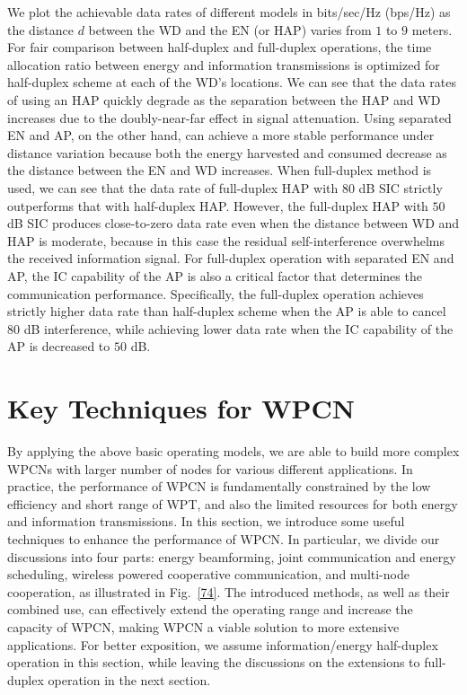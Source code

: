 \documentclass[journal, draftcls, one column, 12pt]{IEEEtran}
\begin{document}
We plot the achievable data rates of different models in bits/sec/Hz (bps/Hz) as the distance $d$ between the WD and the EN (or HAP) varies from $1$ to $9$ meters. For fair comparison between half-duplex and full-duplex operations, the time allocation ratio between energy and information transmissions is optimized for half-duplex scheme at each of the WD's locations. We can see that the data rates of using an HAP quickly degrade as the separation between the HAP and WD increases due to the doubly-near-far effect in signal attenuation. Using separated EN and AP, on the other hand, can achieve a more stable performance under distance variation because both the energy harvested and consumed decrease as the distance between the EN and WD increases. When full-duplex method is used, we can see that the data rate of full-duplex HAP with $80$ dB SIC strictly outperforms that with half-duplex HAP. However, the full-duplex HAP with $50$ dB SIC produces close-to-zero data rate even when the distance between WD and HAP is moderate, because in this case the residual self-interference overwhelms the received information signal. For full-duplex operation with separated EN and AP, the IC capability of the AP is also a critical factor that determines the communication performance. Specifically, the full-duplex operation achieves strictly higher data rate than half-duplex scheme when the AP is able to cancel $80$ dB interference, while achieving lower data rate when the IC capability of the AP is decreased to $50$ dB.

\section{Key Techniques for WPCN}
By applying the above basic operating models, we are able to build more complex WPCNs with larger number of nodes for various different applications. In practice, the performance of WPCN is fundamentally constrained by the low efficiency and short range of WPT, and also the limited resources for both energy and information transmissions. In this section, we introduce some useful techniques to enhance the performance of WPCN. In particular, we divide our discussions into four parts: energy beamforming, joint communication and energy scheduling, wireless powered cooperative communication, and multi-node cooperation, as illustrated in Fig.~\ref{74}. The introduced methods, as well as their combined use, can effectively extend the operating range and increase the capacity of WPCN, making WPCN a viable solution to more extensive applications. For better exposition, we assume information/energy half-duplex operation in this section, while leaving the discussions on the extensions to full-duplex operation in the next section.
\end{document}
